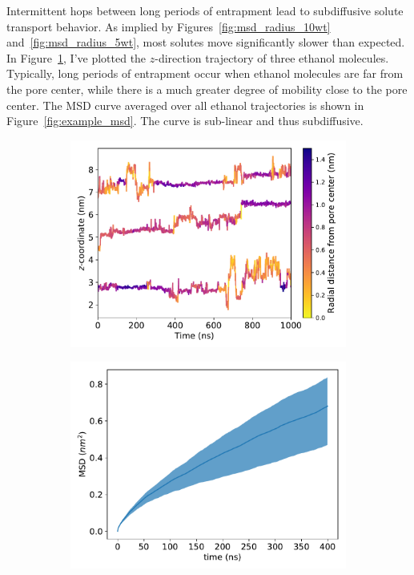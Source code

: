 \documentclass{article}
\begin{document}
  Intermittent hops between long periods of entrapment lead to subdiffusive
  solute transport behavior. As implied by Figures~\ref{fig:msd_radius_10wt} and~\ref{fig:msd_radius_5wt}, 
  most solutes move significantly slower than expected. In 
  Figure~\ref{fig:example_ztraces}, I've plotted the $z$-direction trajectory
  of three ethanol molecules. Typically, long periods of entrapment occur
  when ethanol molecules are far from the pore center, while there is a much 
  greater degree of mobility close to the pore center. The MSD curve averaged
  over all ethanol trajectories is shown in Figure~\ref{fig:example_msd}.
  The curve is sub-linear and thus subdiffusive.
  
  \begin{figure}
  \centering
  \begin{subfigure}{0.49\linewidth}
  \includegraphics[width=\linewidth]{colorful_example_ztraces.pdf}
  \caption{}\label{fig:example_ztraces}
  \end{subfigure}
  \begin{subfigure}{0.49\linewidth}
  \includegraphics[width=\linewidth]{example_msd.pdf}

\end{subfigure}
\end{figure}
\end{document}
